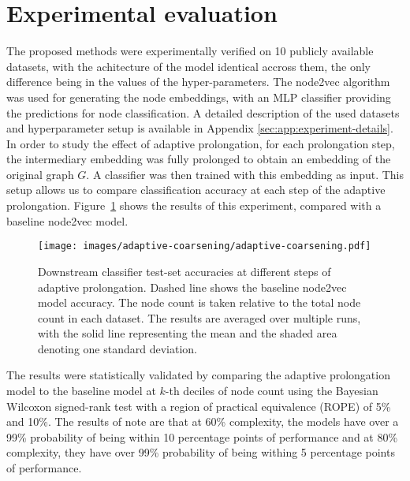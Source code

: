 \section{Experimental evaluation}\label{sec:experimental-evaluation}

The proposed methods were experimentally verified on 10 publicly available datasets, with the achitecture of the model identical accross them, the only difference being in the values of the hyper-parameters. The node2vec algorithm was used for generating the node embeddings, with an MLP classifier providing the predictions for node classification. A detailed description of the used datasets and hyperparameter setup is available in Appendix \ref{sec:app:experiment-details}. In order to study the effect of adaptive prolongation, for each prolongation step, the intermediary embedding was fully prolonged to obtain an embedding of the original graph \( G \). A classifier was then trained with this embedding as input. This setup allows us to compare classification accuracy at each step of the adaptive prolongation. Figure~\ref{fig:adaptive-coarsening} shows the results of this experiment, compared with a baseline node2vec model.

\begin{figure}
  \centering
  \texttt{[image: images/adaptive-coarsening/adaptive-coarsening.pdf]}
  \caption{Downstream classifier test-set accuracies at different steps of adaptive prolongation. Dashed line shows the baseline node2vec model accuracy. The node count is taken relative to the total node count in each dataset. The results are averaged over multiple runs, with the solid line representing the mean and the shaded area denoting one standard deviation.}
  \label{fig:adaptive-coarsening}
\end{figure}

The results were statistically validated by comparing the adaptive prolongation model to the baseline model at \( k \)-th deciles of node count using the Bayesian Wilcoxon signed-rank test \cite{benavoli_bayesian_2014} with a region of practical equivalence (ROPE) of 5\% and 10\%. The results of note are that at 60\% complexity, the models have over a 99\% probability of being within 10 percentage points of performance and at 80\% complexity, they have over 99\% probability of being withing 5 percentage points of performance.
